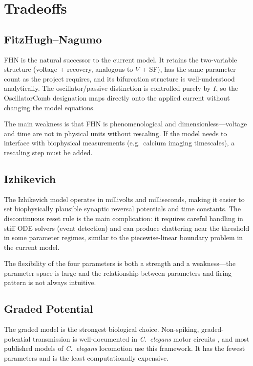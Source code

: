 \documentclass[11pt]{article}
\begin{document}
\section{Tradeoffs}

\subsection{FitzHugh--Nagumo}

FHN is the natural successor to the current model. It retains the two-variable structure
(voltage + recovery, analogous to $V$ + SF), has the same parameter count as the project
requires, and its bifurcation structure is well-understood analytically. The oscillator/passive
distinction is controlled purely by $I$, so the OscillatorComb designation maps directly onto
the applied current without changing the model equations.

The main weakness is that FHN is phenomenological and dimensionless---voltage and time are
not in physical units without rescaling. If the model needs to interface with biophysical
measurements (e.g.\ calcium imaging timescales), a rescaling step must be added.

\subsection{Izhikevich}

The Izhikevich model operates in millivolts and milliseconds, making it easier to set
biophysically plausible synaptic reversal potentials and time constants. The discontinuous
reset rule is the main complication: it requires careful handling in stiff ODE solvers
(event detection) and can produce chattering near the threshold in some parameter regimes,
similar to the piecewise-linear boundary problem in the current model.

The flexibility of the four parameters is both a strength and a weakness---the parameter
space is large and the relationship between parameters and firing pattern is not always
intuitive.

\subsection{Graded Potential}

The graded model is the strongest biological choice. Non-spiking, graded-potential transmission
is well-documented in \textit{C.~elegans} motor circuits \cite{goodman1998}, and most
published models of \textit{C.~elegans} locomotion use this framework. It has the fewest
parameters and is the least computationally expensive.
\end{document}
